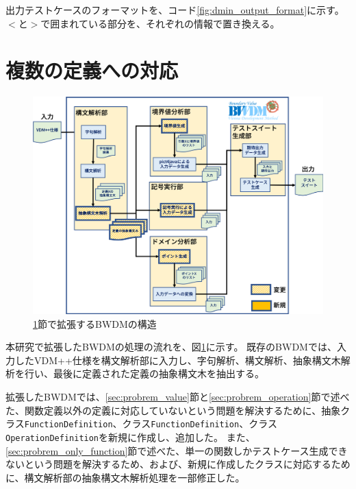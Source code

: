 \documentclass[uplatex, report, a4j, 10pt]{jsbook}
\newcommand\ttt[1]{\texttt{#1}}
\begin{document}
出力テストケースのフォーマットを、コード\ref{fig:dmin_output_format}に示す。$<$と$>$で囲まれている部分を、それぞれの情報で置き換える。

\section{複数の定義への対応}\label{sec:extendMultiple}
\begin{figure}[tp]
  \centering
  \includegraphics[keepaspectratio, width=160mm]{figs/multi_bwdm_structure}
  \caption{\ref{sec:extendMultiple}節で拡張するBWDMの構造}
  \label{fig:multi_bwdm_structure}
\end{figure}

本研究で拡張したBWDMの処理の流れを、図\ref{fig:multi_bwdm_structure}に示す。
既存のBWDMでは、入力したVDM++仕様を構文解析部に入力し、字句解析、構文解析、抽象構文木解析を行い、最後に定義された定義の抽象構文木を抽出する。

拡張したBWDMでは、\ref{sec:probrem_value}節と\ref{sec:probrem_operation}節で述べた、関数定義以外の定義に対応していないという問題を解決するために、抽象クラス\ttt{FunctionDefinition}、クラス\ttt{FunctionDefinition}、クラス\ttt{OperationDefinition}を新規に作成し、追加した。
また、\ref{sec:probrem_only_function}節で述べた、単一の関数しかテストケース生成できないという問題を解決するため、および、新規に作成したクラスに対応するために、構文解析部の抽象構文木解析処理を一部修正した。
\end{document}
